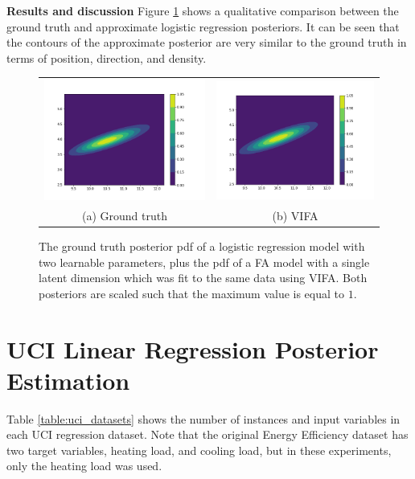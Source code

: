 \documentclass[10pt]{article} %
\begin{document}
\textbf{Results and discussion} Figure \ref{fig:logistic_regression_synthetic_data_posterior} shows a qualitative comparison between the ground truth and approximate logistic regression posteriors. It can be seen that the contours of the approximate posterior are very similar to the ground truth in terms of position, direction, and density.
\begin{figure}[!htbp] 
\begin{center}
\begin{tabular}{cc}
	\includegraphics[width=70mm]{plots/logistic_regression_synthetic_true_posterior.png}
	& \includegraphics[width=70mm]{plots/logistic_regression_synthetic_vifa_posterior.png} \\
	(a) Ground truth
	& (b) VIFA \\[6pt]
\end{tabular}
\end{center}
\caption{The ground truth posterior pdf of a logistic regression model with two learnable parameters, plus the pdf of a FA model with a single latent dimension which was fit to the same data using VIFA. Both posteriors are scaled such that the maximum value is equal to $1$.}
\label{fig:logistic_regression_synthetic_data_posterior}
\end{figure}

\section{UCI Linear Regression Posterior Estimation}
\label{app:uci_posterior}
Table \ref{table:uci_datasets} shows the number of instances and input variables in each UCI regression dataset. Note that the original Energy Efficiency dataset has two target variables, heating load, and cooling load, but in these experiments, only the heating load was used.
\end{document}
